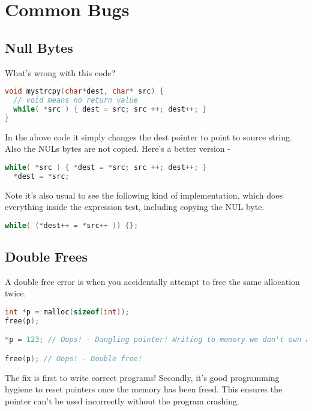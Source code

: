 \section{Common Bugs}

\subsection{Null Bytes}

What's wrong with this code?

\begin{lstlisting}[language=C]
void mystrcpy(char*dest, char* src) {
  // void means no return value
  while( *src ) { dest = src; src ++; dest++; }
}
\end{lstlisting}

In the above code it simply changes the dest pointer to point to source string. Also the NULs bytes are not copied. Here's a better version -

\begin{lstlisting}[language=C]
  while( *src ) { *dest = *src; src ++; dest++; }
  *dest = *src;
\end{lstlisting}

Note it's also usual to see the following kind of implementation, which does everything inside the expression test, including copying the NUL byte.

\begin{lstlisting}[language=C]
  while( (*dest++ = *src++ )) {};
\end{lstlisting}

\subsection{Double Frees}

A double free error is when you accidentally attempt to free the same allocation twice.

\begin{lstlisting}[language=C]
int *p = malloc(sizeof(int));
free(p);

*p = 123; // Oops! - Dangling pointer! Writing to memory we don't own anymore

free(p); // Oops! - Double free!
\end{lstlisting}

The fix is first to write correct programs!
Secondly, it's good programming hygiene to reset pointers once the memory has been freed.
This ensures the pointer can't be used incorrectly without the program crashing.

